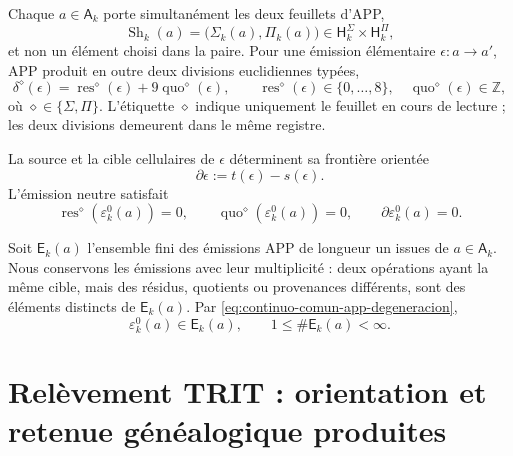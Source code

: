 Chaque \(a\in\mathsf A_k\) porte simultanément les deux feuillets d'APP,
\begin{equation}
\label{eq:continuo-comun-dos-hojas}
 \operatorname{Sh}_k(a)
 =\bigl(\Sigma_k(a),\Pi_k(a)\bigr)
 \in\mathsf H_k^{\Sigma}\times\mathsf H_k^{\Pi},
\end{equation}
et non un élément choisi dans la paire. Pour une émission élémentaire \(\epsilon:a\to a'\), APP produit en outre deux divisions euclidiennes typées,
\begin{equation}
\label{eq:continuo-comun-residuo-cociente-app}
 \delta^{\diamond}(\epsilon)
 =\operatorname{res}^{\diamond}(\epsilon)
  +9\operatorname{quo}^{\diamond}(\epsilon),
 \qquad
 \operatorname{res}^{\diamond}(\epsilon)\in\{0,\ldots,8\},
 \quad
 \operatorname{quo}^{\diamond}(\epsilon)\in\mathbb Z,
\end{equation}
où \(\diamond\in\{\Sigma,\Pi\}\). L'étiquette \(\diamond\) indique uniquement le feuillet en cours de lecture ; les deux divisions demeurent dans le même registre.

La source et la cible cellulaires de \(\epsilon\) déterminent sa frontière orientée
\begin{equation}
\label{eq:continuo-comun-frontera-elemental}
 \partial\epsilon:=t(\epsilon)-s(\epsilon).
\end{equation}
L'émission neutre satisfait
\begin{equation}
\label{eq:continuo-comun-neutral-app-datos}
 \operatorname{res}^{\diamond}(\varepsilon^0_k(a))=0,
 \qquad
 \operatorname{quo}^{\diamond}(\varepsilon^0_k(a))=0,
 \qquad
 \partial\varepsilon^0_k(a)=0.
\end{equation}

\begin{definition}
\label{def:continuo-comun-grafo-app}
Soit \(\mathsf E_k(a)\) l'ensemble fini des émissions APP de longueur un issues de \(a\in\mathsf A_k\). Nous conservons les émissions avec leur multiplicité : deux opérations ayant la même cible, mais des résidus, quotients ou provenances différents, sont des éléments distincts de \(\mathsf E_k(a)\). Par \eqref{eq:continuo-comun-app-degeneracion},
\begin{equation}
\label{eq:continuo-comun-out-no-vacio-app}
 \varepsilon^0_k(a)\in\mathsf E_k(a),
 \qquad
 1\leq \#\mathsf E_k(a)<\infty.
\end{equation}
\end{definition}

\section{Relèvement TRIT : orientation et retenue généalogique produites}
\label{sec:continuo-comun-trit-lift}

